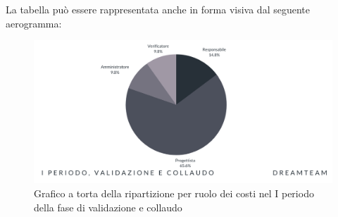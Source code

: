 La tabella può essere rappresentata anche in forma visiva dal seguente aerogramma:
\begin{figure}[H]
\centering
\includegraphics[scale=0.65]{Sezioni/SezioniPreventivo/grafici/Validazione_I_periodo_costi.png}
\caption{Grafico a torta della ripartizione per ruolo dei costi nel I periodo della fase di validazione e collaudo}
\end{figure}



